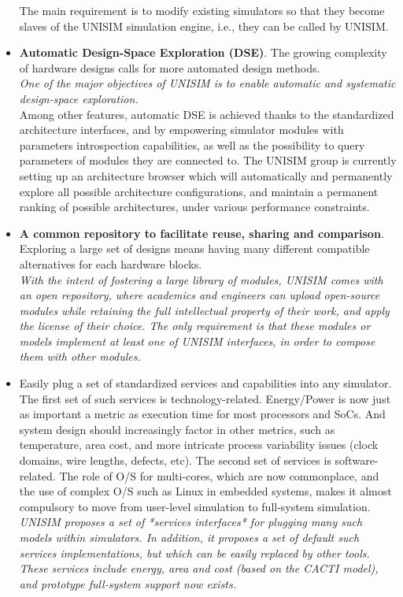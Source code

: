 \begin{itemize}
The main requirement is to modify existing simulators so that they become slaves of the UNISIM simulation engine, i.e., they can be called by UNISIM.
\item \textbf{Automatic Design-Space Exploration (DSE)}. The growing complexity of hardware designs calls for more automated design methods.\\
\emph{One of the major objectives of UNISIM is to enable automatic and systematic design-space exploration.}\\
Among other features, automatic DSE is achieved thanks to the standardized architecture interfaces, and by empowering simulator modules with parameters introspection capabilities, as well as the possibility to query parameters of modules they are connected to. The UNISIM group is currently setting up an architecture browser which will automatically and permanently explore all possible architecture configurations, and maintain a permanent ranking of possible architectures, under various performance constraints.
\item \textbf{A common repository to facilitate reuse, sharing and comparison}. Exploring a large set of designs means having many different compatible alternatives for each hardware blocks.\\
\emph{With the intent of fostering a large library of modules, UNISIM comes with an open repository, where academics and engineers can upload open-source modules while retaining the full intellectual property of their work, and apply the license of their choice. The only requirement is that these modules or models implement at least one of UNISIM interfaces, in order to compose them with other modules.}
\item Easily plug a set of standardized services and capabilities into any simulator. The first set of such services is technology-related. Energy/Power is now just as important a metric as execution time for most processors and SoCs. And system design should increasingly factor in other metrics, such as temperature, area cost, and more intricate process variability issues (clock domains, wire lengths, defects, etc). The second set of services is software-related. The role of O/S for multi-cores, which are now commonplace, and the use of complex O/S such as Linux in embedded systems, makes it almost compulsory to move from user-level simulation to full-system simulation.\\
\emph{UNISIM proposes a set of *services interfaces* for plugging many such models within simulators. In addition, it proposes a set of default such services implementations, but which can be easily replaced by other tools. These services include energy, area and cost (based on the CACTI model), and prototype full-system support now exists.}

\end{itemize}
